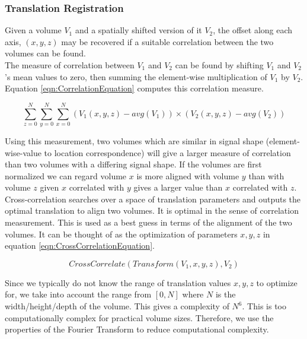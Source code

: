 


\subsubsection{Translation Registration}

Given a volume $V_1$ and a spatially shifted version of it $V_2$, the offset along each axis, $(x,y,z)$ may be recovered if a suitable correlation between the two volumes can be found. \\

The measure of correlation between $V_1$ and $V_2$ can be found by shifting $V_1$ and $V_2$'s mean values to zero, then summing the element-wise multiplication of $V_1$ by $V_2$. Equation \ref{eqn:CorrelationEquation} computes this correlation measure.

\begin{equation} \label{eqn:CorrelationEquation}
\sum_{z=0}^{N}\sum_{y=0}^{N}\sum_{x=0}^{N}(V_1(x,y,z)-avg(V_1)) \times (V_2(x,y,z)-avg(V_2))
\end{equation}

Using this measurement, two volumes which are similar in signal shape (element-wise-value to location correspondence) will give a larger measure of correlation than two volumes with a differing signal shape. If the volumes are first normalized we can regard volume $x$ is more aligned with volume $y$ than with volume $z$ given $x$ correlated with $y$ gives a larger value than $x$ correlated with $z$. \\

Cross-correlation searches over a space of translation parameters and outputs the optimal translation to align two volumes. It is optimal in the sense of correlation measurement. This is used as a best guess in terms of the alignment of the two volumes. It can be thought of as the optimization of parameters $x,y,z$ in equation \ref{eqn:CrossCorrelationEquation}.

\begin{equation} \label{eqn:CrossCorrelationEquation}
CrossCorrelate(Transform(V_1, x,y,z), V_2)
\end{equation}

Since we typically do not know the range of translation values $x,y,z$ to optimize for, we take into account the range from $[0,N]$ where $N$ is the width/height/depth of the volume. This gives a complexity of $N^6$. This is too computationally complex for practical volume sizes. Therefore, we use the properties of the Fourier Transform to reduce computational complexity. \\
 
